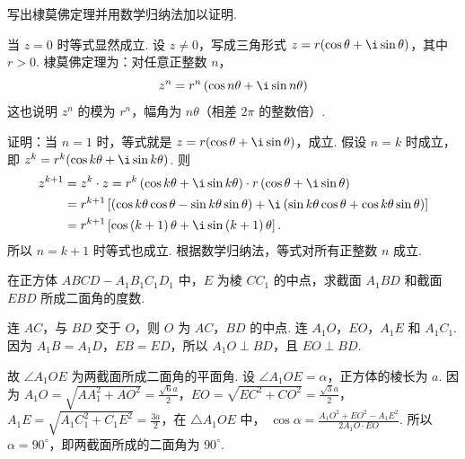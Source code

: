 \documentclass[UTF8,a4paper,oneside,11pt]{ctexbook}
\begin{document}
\begin{problem}

写出棣莫佛定理并用数学归纳法加以证明.
\end{problem}

\begin{solution}
当 \(z=0\) 时等式显然成立. 设 \(z\neq0\)，写成三角形式 \(z=r(\cos\theta+\i\sin\theta)\)，其中 \(r>0\). 棣莫佛定理为：对任意正整数 \(n\)，
\[
z^n=r^n\left(\cos n\theta+\i\sin n\theta\right)
\]
这也说明 \(z^n\) 的模为 \(r^n\)，幅角为 \(n\theta\)（相差 \(2\pi\) 的整数倍）.

证明：当 \(n=1\) 时，等式就是 \(z=r(\cos\theta+\i\sin\theta)\)，成立. 假设 \(n=k\) 时成立，即
\(z^k=r^k(\cos k\theta+\i\sin k\theta)\). 则
\[
\begin{aligned}
z^{k+1}
&=z^{k}\cdot z
=r^{k}\left( \cos k\theta+\i\sin k\theta \right)\cdot r\left( \cos \theta+\i\sin \theta \right)\\
&=r^{k+1}\left[ \left( \cos k\theta\cos \theta-\sin k\theta\sin \theta \right)+\i\left( \sin k\theta\cos \theta+\cos k\theta\sin \theta \right) \right]\\
&=r^{k+1}\left[ \cos \left( k+1 \right)\theta+\i\sin \left( k+1 \right)\theta \right].
\end{aligned}
\]
所以 \(n=k+1\) 时等式也成立. 根据数学归纳法，等式对所有正整数 \(n\) 成立.
\end{solution}

\begin{problem}

在正方体 \(ABCD - A_{1}B_{1}C_{1}D_{1}\) 中，\(E\) 为棱 \(CC_{1}\) 的中点，求截面 \(A_{1}BD\) 和截面 \(EBD\) 所成二面角的度数.

\end{problem}

\begin{solution}
%
连 \(AC\)，与 \(BD\) 交于 \(O\)，则 \(O\) 为 \(AC\)，\(BD\) 的中点. 连 \(A_{1}O\)，\(EO\)，\(A_{1}E\) 和 \(A_{1}C_{1}\).
因为 \(A_{1}B=A_{1}D\)，\(EB=ED\)，所以 \(A_{1}O\perp BD\)，且 \(EO\perp BD\).

故 \(\angle A_{1}OE\) 为两截面所成二面角的平面角. 设 \(\angle A_{1}OE=\alpha\)，正方体的棱长为 \(a\).
因为 \(A_{1}O=\sqrt{AA_{1}^{2}+AO^{2}}=\frac{\sqrt{6}a}{2}\)，\(EO=\sqrt{EC^{2}+CO^{2}}=\frac{\sqrt{3}a}{2}\)，\(A_{1}E=\sqrt{A_{1}C_{1}^{2}+C_{1}E^{2}}=\frac{3a}{2}\)，在 \(\triangle A_{1}OE\) 中，
\(\cos \alpha=\frac{A_{1}O^{2}+EO^{2}-A_{1}E^{2}}{2A_{1}O\cdot EO}\).
所以 \(\alpha=90^{\circ}\)，即两截面所成的二面角为 \(90^{\circ}\).
\end{solution}
\end{document}
